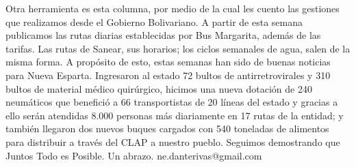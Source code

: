 \documentclass{article}%
\begin{document}
\newline%
%
Otra herramienta es esta columna, por medio de la cual les cuento las gestiones que realizamos desde el Gobierno Bolivariano. A partir de esta semana publicamos las rutas diarias establecidas por Bus Margarita, además de las tarifas. Las rutas de Sanear, sus horarios; los ciclos semanales de agua, salen de la misma forma.%
\newline%
%
A propósito de esto, estas semanas han sido de buenas noticias para Nueva Esparta. Ingresaron al estado 72 bultos de antirretrovirales y 310 bultos de material médico quirúrgico, hicimos una nueva dotación de 240 neumáticos que benefició a 66 transportistas de 20 líneas del estado y gracias a ello serán atendidas 8.000 personas más diariamente en 17 rutas de la entidad; y también llegaron dos nuevos buques cargados con 540 toneladas de alimentos para distribuir a través del CLAP a nuestro pueblo. Seguimos demostrando que Juntos Todo es Posible. Un abrazo.%
\newline%
%
ne.danterivas@gmail.com%
\newline%
%
\end{document}
